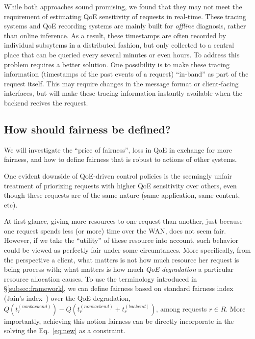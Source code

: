 While both approaches sound promising, we found that they may not meet the requirement of estimating QoE sensitivity of requests in real-time. 
These tracing systems and QoE recording systems are mainly built for {\em offline} diagnosis, rather than online inference. As a result, these timestamps are often recorded by individual subsytems in a distributed fashion, but only collected to a central place that can be queried every several minutes or even hours. 
To address this problem requires a better solution. 
One possibility is to make these tracing information (\eg timestamps of the past events of a request) ``in-band'' as part of the request itself. This may require changes in the message format or client-facing interfaces, but will make these tracing information instantly available when the backend recives the request.

\subsection{How should fairness be defined?}
\begin{task}
We will investigate the ``price of fairness'', \ie loss in QoE in exchange for more fairness, and how to define fairness that is robust to actions of other systems.
\end{task}

One evident downside of QoE-driven control policies is the seemingly unfair treatment of priorizing requests with higher QoE sensitivity over others, even though these requests are of the same nature (same application, same content, etc).

At first glance, giving more resources to one request than another, just because one request spends less (or more) time over the WAN, does not seem fair.
However, if we take the ``utility'' of these resource into account, such behavior could be viewed as perfectly fair under some circumtances.
More specifically, from the perspective a client, what matters is not how much resource her request is being process with; what matters is how much {\em QoE degradation} a particular resource allocation causes.
To use the  terminology  introduced in \S\ref{subsec:framework}, we can define fairness based on standard fairness index (\eg Jain's index~\cite{??}) over the QoE degradation, \ie $Q\left(t_{r}^{(nonbackend)}\right)-Q\left(t_{r}^{(nonbackend)}+t_{r}^{(backend)}\right)$, among requests $r\in R$.
More importantly, achieving this notion fairness can be directly incorporate in the solving the Eq.~\ref{eq:new} as a constraint.

